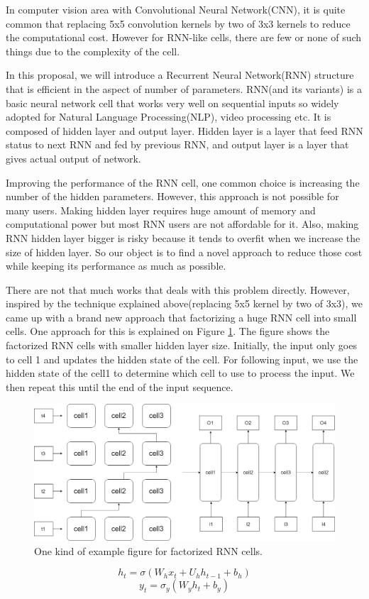 \setlength\parindent{8pt}
In computer vision area with Convolutional Neural Network(CNN), it is quite common that replacing 5x5 convolution kernels by two of 3x3 kernels to reduce the computational cost\cite{Inception}. However for RNN-like cells, there are few or none of such things due to the complexity of the cell.

In this proposal, we will introduce a Recurrent Neural Network(RNN) structure that is efficient in the aspect of number of parameters. RNN(and its variants) is a basic neural network cell that works very well on sequential inputs so widely adopted for Natural Language Processing(NLP), video processing etc. It is composed of hidden layer and output layer. Hidden layer is a layer that feed RNN status to next RNN and fed by previous RNN, and output layer is a layer that gives actual output of network.

Improving the performance of the RNN cell, one common choice is increasing the number of the hidden parameters. However, this approach is not possible for many users. Making hidden layer requires huge amount of memory and computational power but most RNN users are not affordable for it. Also, making RNN hidden layer bigger is risky because it tends to overfit when we increase the size of hidden layer. So our object is to find a novel approach to reduce those cost while keeping its performance as much as possible.

There are not that much works that deals with this problem directly. However, inspired by the technique explained above(replacing 5x5 kernel by two of 3x3), we came up with a brand new approach that factorizing a huge RNN cell into small cells. One approach for this is explained on Figure \ref{fig:RNNcell1}. The figure shows the factorized RNN cells with smaller hidden layer size. Initially, the input only goes to cell 1 and updates the hidden state of the cell. For following input, we use the hidden state of the cell1 to determine which cell to use to process the input. We then repeat this until the end of the input sequence.
\begin{figure}
  \includegraphics[width=\linewidth]{pictures/RNNfig1.png}
  \caption{One kind of example figure for factorized RNN cells.}
  \label{fig:RNNcell1}
\end{figure}
$$h_t = \sigma(W_hx_t+U_hh_{t-1}+b_h)\label{Elman}$$
$$y_t = \sigma_y(W_yh_t+b_y)$$
\cite{Elman90}

